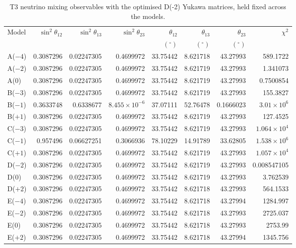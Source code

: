\begin{table}[p]
\centering
\caption{T3 neutrino mixing observables with the optimised D(-2) Yukawa matrices, held fixed across the models.}
\label{tab:appC_Dm2_mixing}
\begingroup
\footnotesize
\setlength{\tabcolsep}{3.2pt}
\begin{tabular}{lrrrrrrr}
\hline
Model & $\sin^2\theta_{12}$ & $\sin^2\theta_{13}$ & $\sin^2\theta_{23}$ & $\theta_{12}$ & $\theta_{13}$ & $\theta_{23}$ & $\chi^2$ \\
 &  &  &  & $(^\circ)$ & $(^\circ)$ & $(^\circ)$ &  \\
\hline
A($-4$) & 0.3087296 & 0.02247305 & 0.4699972 & 33.75442 & 8.621718 & 43.27993 & 589.1722 \\
A($-2$) & 0.3087296 & 0.02247305 & 0.4699972 & 33.75442 & 8.621719 & 43.27993 & 1.341073 \\
A($0$) & 0.3087296 & 0.02247305 & 0.4699972 & 33.75442 & 8.621719 & 43.27993 & 0.7500854 \\
B($-3$) & 0.3087296 & 0.02247305 & 0.4699972 & 33.75442 & 8.621719 & 43.27993 & 155.3827 \\
B($-1$) & 0.3633748 & 0.6338677 & $8.455\times10^{-6}$ & 37.07111 & 52.76478 & 0.1666023 & $3.01\times10^{6}$ \\
B($+1$) & 0.3087296 & 0.02247305 & 0.4699972 & 33.75442 & 8.621719 & 43.27993 & 127.4525 \\
C($-3$) & 0.3087296 & 0.02247305 & 0.4699972 & 33.75442 & 8.621719 & 43.27993 & $1.064\times10^{4}$ \\
C($-1$) & 0.957496 & 0.06627251 & 0.3066936 & 78.10229 & 14.91789 & 33.62805 & $1.538\times10^{6}$ \\
C($+1$) & 0.3087296 & 0.02247305 & 0.4699972 & 33.75442 & 8.621719 & 43.27993 & $1.057\times10^{4}$ \\
D($-2$) & 0.3087296 & 0.02247305 & 0.4699972 & 33.75442 & 8.621719 & 43.27993 & 0.008547105 \\
D($0$) & 0.3087296 & 0.02247305 & 0.4699972 & 33.75442 & 8.621719 & 43.27993 & 3.762539 \\
D($+2$) & 0.3087296 & 0.02247305 & 0.4699972 & 33.75442 & 8.621718 & 43.27993 & 564.1533 \\
E($-4$) & 0.3087296 & 0.02247305 & 0.4699972 & 33.75442 & 8.621718 & 43.27994 & 1284.997 \\
E($-2$) & 0.3087296 & 0.02247305 & 0.4699972 & 33.75442 & 8.621718 & 43.27993 & 2725.037 \\
E($0$) & 0.3087296 & 0.02247305 & 0.4699972 & 33.75442 & 8.621718 & 43.27993 & 2753.99 \\
E($+2$) & 0.3087296 & 0.02247305 & 0.4699972 & 33.75442 & 8.621718 & 43.27994 & 1345.756 \\
\hline
\end{tabular}
\endgroup
\end{table}
